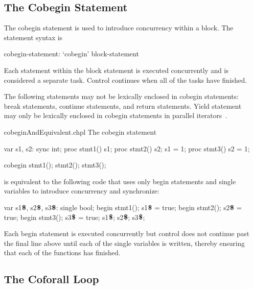 \subsection{The Cobegin Statement}
\label{Cobegin}

The cobegin statement is used to introduce concurrency within a
block.  The  statement syntax is
\begin{syntax}
cobegin-statement:
  `cobegin' block-statement
\end{syntax}
Each statement within the block statement is executed concurrently and
is considered a separate task.  Control continues when all of the
tasks have finished.

The following statements may not be lexically enclosed in
cobegin statements: break statements, continue statements, and
return statements.  Yield statement may only be lexically enclosed in
cobegin statements in parallel iterators~.

\begin{chapelexample}{cobeginAndEquivalent.chpl}
The cobegin statement
\begin{chapelpre}
var s1, s2: sync int;
proc stmt1() { s1; }
proc stmt2() { s2; s1 = 1; }
proc stmt3() { s2 = 1; }
\end{chapelpre}
\begin{chapel}
cobegin {
  stmt1();
  stmt2();
  stmt3();
}
\end{chapel}
is equivalent to the following code that uses only begin statements
and single variables to introduce concurrency and synchronize:
\begin{chapel}
var s1$\mbox{{\bf \$}}$, s2$\mbox{{\bf \$}}$, s3$\mbox{{\bf \$}}$: single bool;
begin { stmt1(); s1$\mbox{{\bf \$}}$ = true; }
begin { stmt2(); s2$\mbox{{\bf \$}}$ = true; }
begin { stmt3(); s3$\mbox{{\bf \$}}$ = true; }
s1$\mbox{{\bf \$}}$; s2$\mbox{{\bf \$}}$; s3$\mbox{{\bf \$}}$;
\end{chapel}
\begin{chapeloutput}
\end{chapeloutput}
Each begin statement is executed concurrently but control does not
continue past the final line above until each of the single variables
is written, thereby ensuring that each of the functions has finished.
\end{chapelexample}

\subsection{The Coforall Loop}
\label{Coforall}

